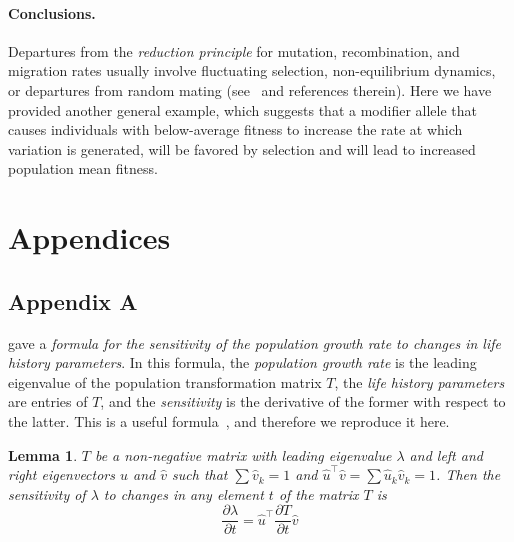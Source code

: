 \documentclass[12pt, twocolumn]{extarticle}
\newcommand*{\tr}{^\intercal}
\newtheorem{lemma}{Lemma}
\begin{document}
\paragraph*{Conclusions.}

Departures from the \emph{reduction principle} for mutation, recombination, and migration rates usually involve fluctuating selection,  non-equilibrium dynamics, or departures from random mating (see~\cite{Carja2014} and references therein).
Here we have provided another general example, which suggests that a modifier allele that causes individuals with below-average fitness to increase the rate at which variation is generated, will be favored by selection and will lead to increased population mean fitness.

\section*{Appendices}

\subsection*{Appendix A}\label{sec:AppA}

\citet{Caswell1978} gave a \emph{formula for the sensitivity of the population growth rate to changes in life history parameters}.
In this formula, the \emph{population growth rate} is the leading eigenvalue of the population transformation matrix $T$, the \emph{life history parameters} are entries of $T$, and the \emph{sensitivity} is the derivative of the former with respect to the latter.
This is a useful formula~\citep[ch.~10]{Caswell1978,Hermisson2002,Ram2012,Otto2007}, and therefore we reproduce it here.

\begin{lemma}
$T$ be a non-negative matrix with leading eigenvalue $\lambda$ and left and right eigenvectors $\hat u$ and $\hat v$ such that $\sum{\hat v_k}=1$ and $\hat u\tr \hat v = \sum{\hat u_k \hat v_k} = 1$.
Then the sensitivity of $\lambda$ to changes in any element $t$ of the matrix $T$ is
\begin{equation}\label{eq:Caswells_formula}
\frac{\partial \lambda}{\partial t} = 
\hat u\tr \frac{\partial T}{\partial t} \hat v
\end{equation}
\end{lemma}
\end{document}
